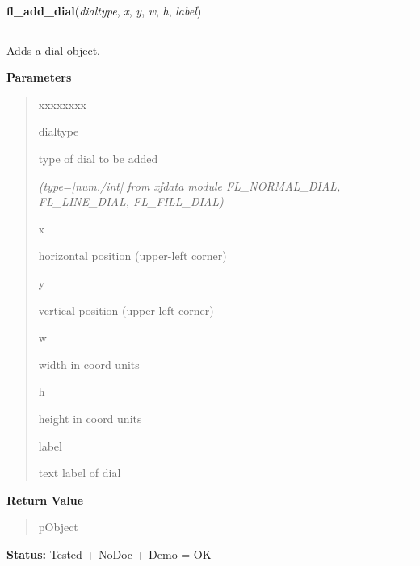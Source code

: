 \hspace{.8\funcindent}\begin{boxedminipage}{\funcwidth}

    \raggedright \textbf{fl\_add\_dial}(\textit{dialtype}, \textit{x}, \textit{y}, \textit{w}, \textit{h}, \textit{label})

    \vspace{-1.5ex}

    \rule{\textwidth}{0.5\fboxrule}
\setlength{\parskip}{2ex}
    Adds a dial object.

\setlength{\parskip}{1ex}
      \textbf{Parameters}
      \vspace{-1ex}

      \begin{quote}
        \begin{Ventry}{xxxxxxxx}

          \item[dialtype]

          type of dial to be added

            {\it (type=[num./int] from xfdata module FL\_NORMAL\_DIAL, FL\_LINE\_DIAL, 
FL\_FILL\_DIAL)}

          \item[x]

          horizontal position (upper-left corner)

          \item[y]

          vertical position (upper-left corner)

          \item[w]

          width in coord units

          \item[h]

          height in coord units

          \item[label]

          text label of dial

        \end{Ventry}

      \end{quote}

      \textbf{Return Value}
    \vspace{-1ex}

      \begin{quote}
      pObject

      \end{quote}

\textbf{Status:} Tested + NoDoc + Demo = OK



    \end{boxedminipage}

